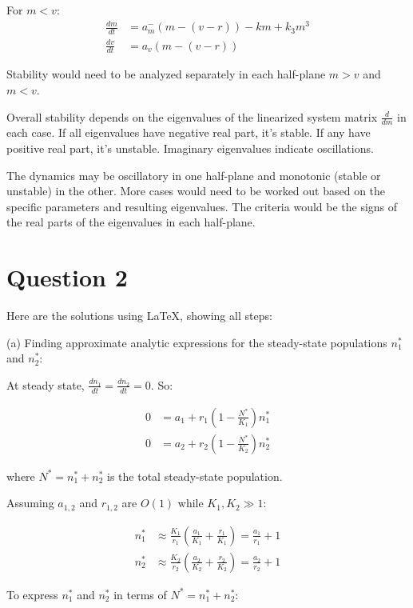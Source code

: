 \documentclass{article}
\begin{document}
For $m < v$:
\begin{align*}
\frac{dm}{dt} &= a_m^-(m - (v - r)) - km + k_3m^3\\
\frac{dv}{dt} &= a_v(m - (v - r))
\end{align*}

Stability would need to be analyzed separately in each half-plane $m>v$ and $m<v$.

Overall stability depends on the eigenvalues of the linearized system matrix $\frac{d}{dm}$ in each case. If all eigenvalues have negative real part, it's stable. If any have positive real part, it's unstable. Imaginary eigenvalues indicate oscillations.

The dynamics may be oscillatory in one half-plane and monotonic (stable or unstable) in the other. More cases would need to be worked out based on the specific parameters and resulting eigenvalues. The criteria would be the signs of the real parts of the eigenvalues in each half-plane.

\section{Question 2}

Here are the solutions using LaTeX, showing all steps:

(a) Finding approximate analytic expressions for the steady-state populations $n^*_1$ and $n^*_2$:

At steady state, $\frac{dn_1}{dt} = \frac{dn_2}{dt} = 0$. So:

\begin{align*}
0 &= a_1 + r_1\left(1 - \frac{N^*}{K_1}\right)n^*_1 \\
0 &= a_2 + r_2\left(1 - \frac{N^*}{K_2}\right)n^*_2
\end{align*}

where $N^* = n^*_1 + n^*_2$ is the total steady-state population.

Assuming $a_{1,2}$ and $r_{1,2}$ are $O(1)$ while $K_1, K_2 \gg 1$:

\begin{align*}
n^*_1 &\approx \frac{K_1}{r_1}\left(\frac{a_1}{K_1} + \frac{r_1}{K_1}\right) = \frac{a_1}{r_1} + 1 \\
n^*_2 &\approx \frac{K_2}{r_2}\left(\frac{a_2}{K_2} + \frac{r_2}{K_2}\right) = \frac{a_2}{r_2} + 1
\end{align*}

To express $n^*_1$ and $n^*_2$ in terms of $N^* = n^*_1 + n^*_2$:
\end{document}
